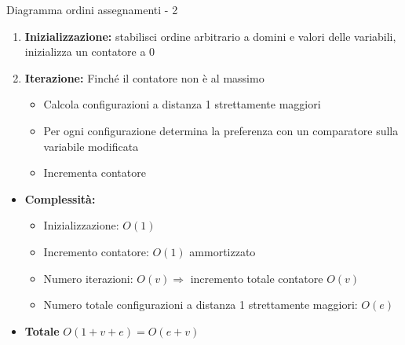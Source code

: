 \begin{frame}{Diagramma ordini assegnamenti - 2}
\begin{enumerate}
  \item \textbf{Inizializzazione:} stabilisci ordine arbitrario a domini e valori delle variabili, 
  inizializza un contatore a 0
  \item \textbf{Iterazione:} Finché il contatore non è al massimo
  \begin{itemize}
  	\item Calcola configurazioni a distanza 1 strettamente maggiori
  	\item Per ogni configurazione determina la preferenza con un comparatore sulla variabile modificata
  	\item Incrementa contatore
  \end{itemize}
\end{enumerate}
\pause
\begin{itemize}
  \item \textbf{Complessità:}
  \begin{itemize}
  	\item Inizializzazione: $O(1)$
  	\item Incremento contatore: $O(1)$ ammortizzato
  	\item Numero iterazioni: $O(v) \Rightarrow $ incremento totale contatore $O(v)$  
  	\item Numero totale configurazioni a distanza 1 strettamente maggiori: $O(e)$
  \end{itemize}
  \item \textbf{Totale} $O(1+v+e)=O(e+v)$
\end{itemize}
\end{frame}